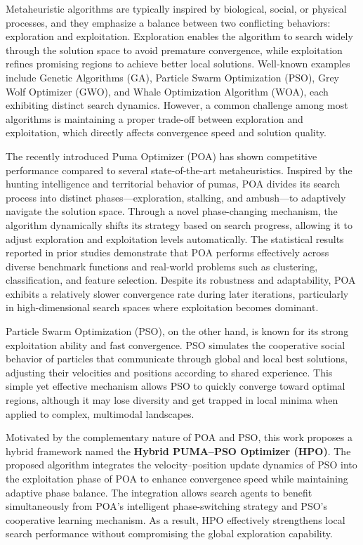 \documentclass[a4paper,12pt]{article}
\begin{document}
Metaheuristic algorithms are typically inspired by biological, social, or physical processes, and they emphasize a balance between two conflicting behaviors: exploration and exploitation. Exploration enables the algorithm to search widely through the solution space to avoid premature convergence, while exploitation refines promising regions to achieve better local solutions. Well-known examples include Genetic Algorithms (GA), Particle Swarm Optimization (PSO), Grey Wolf Optimizer (GWO), and Whale Optimization Algorithm (WOA), each exhibiting distinct search dynamics. However, a common challenge among most algorithms is maintaining a proper trade-off between exploration and exploitation, which directly affects convergence speed and solution quality.

The recently introduced Puma Optimizer (POA) has shown competitive performance compared to several state-of-the-art metaheuristics. Inspired by the hunting intelligence and territorial behavior of pumas, POA divides its search process into distinct phases—exploration, stalking, and ambush—to adaptively navigate the solution space. Through a novel phase-changing mechanism, the algorithm dynamically shifts its strategy based on search progress, allowing it to adjust exploration and exploitation levels automatically. The statistical results reported in prior studies demonstrate that POA performs effectively across diverse benchmark functions and real-world problems such as clustering, classification, and feature selection. Despite its robustness and adaptability, POA exhibits a relatively slower convergence rate during later iterations, particularly in high-dimensional search spaces where exploitation becomes dominant.

Particle Swarm Optimization (PSO), on the other hand, is known for its strong exploitation ability and fast convergence. PSO simulates the cooperative social behavior of particles that communicate through global and local best solutions, adjusting their velocities and positions according to shared experience. This simple yet effective mechanism allows PSO to quickly converge toward optimal regions, although it may lose diversity and get trapped in local minima when applied to complex, multimodal landscapes.

Motivated by the complementary nature of POA and PSO, this work proposes a hybrid framework named the \textbf{Hybrid PUMA--PSO Optimizer (HPO)}. The proposed algorithm integrates the velocity–position update dynamics of PSO into the exploitation phase of POA to enhance convergence speed while maintaining adaptive phase balance. The integration allows search agents to benefit simultaneously from POA’s intelligent phase-switching strategy and PSO’s cooperative learning mechanism. As a result, HPO effectively strengthens local search performance without compromising the global exploration capability.
\end{document}
